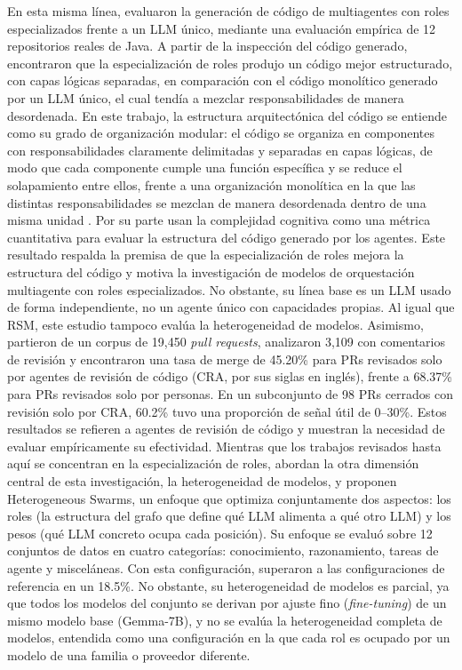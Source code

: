 En esta misma línea, \textcite{donato2026rolebased} evaluaron la generación de código de multiagentes con roles especializados frente a un LLM único, mediante una evaluación empírica de 12 repositorios reales de Java. A partir de la inspección del código generado, encontraron que la especialización de roles produjo un código mejor estructurado, con capas lógicas separadas, en comparación con el código monolítico generado por un LLM único, el cual tendía a mezclar responsabilidades de manera desordenada. En este trabajo, la estructura arquitectónica del código se entiende como su grado de organización modular: el código se organiza en componentes con responsabilidades claramente delimitadas y separadas en capas lógicas, de modo que cada componente cumple una función específica y se reduce el solapamiento entre ellos, frente a una organización monolítica en la que las distintas responsabilidades se mezclan de manera desordenada dentro de una misma unidad \parencite{donato2026rolebased}. Por su parte \textcite{agarwal2026codingagents} usan la complejidad cognitiva como una métrica cuantitativa para evaluar la estructura del código generado por los agentes. Este resultado respalda la premisa de que la especialización de roles mejora la estructura del código y motiva la investigación de modelos de orquestación multiagente con roles especializados. No obstante, su línea base es un LLM usado de forma independiente, no un agente único con capacidades propias. Al igual que RSM, este estudio tampoco evalúa la heterogeneidad de modelos. Asimismo, \textcite{chowdhury2026cragents} partieron de un corpus de 19,450 \textit{pull requests}, analizaron 3,109 con comentarios de revisión y encontraron una tasa de merge de 45.20\% para PRs revisados solo por agentes de revisión de código (CRA, por sus siglas en inglés), frente a 68.37\% para PRs revisados solo por personas. En un subconjunto de 98 PRs cerrados con revisión solo por CRA, 60.2\% tuvo una proporción de señal útil de 0–30\%. Estos resultados se refieren a agentes de revisión de código y muestran la necesidad de evaluar empíricamente su efectividad. Mientras que los trabajos revisados hasta aquí se concentran en la especialización de roles, \textcite{feng2025heteroswarms} abordan la otra dimensión central de esta investigación, la heterogeneidad de modelos, y proponen Heterogeneous Swarms, un enfoque que optimiza conjuntamente dos aspectos: los roles (la estructura del grafo que define qué LLM alimenta a qué otro LLM) y los pesos (qué LLM concreto ocupa cada posición). Su enfoque se evaluó sobre 12 conjuntos de datos en cuatro categorías: conocimiento, razonamiento, tareas de agente y misceláneas. Con esta configuración, superaron a las configuraciones de referencia en un 18.5\%. No obstante, su heterogeneidad de modelos es parcial, ya que todos los modelos del conjunto se derivan por ajuste fino (\textit{fine-tuning}) de un mismo modelo base (Gemma-7B), y no se evalúa la heterogeneidad completa de modelos, entendida como una configuración en la que cada rol es ocupado por un modelo de una familia o proveedor diferente. 


